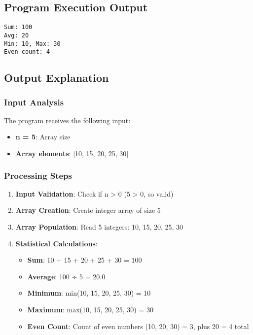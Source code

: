 \documentclass[12pt,a4paper]{article}
\begin{document}
\subsection{Program Execution Output}

\begin{lstlisting}[caption=Final Output: output.txt]
Sum: 100
Avg: 20
Min: 10, Max: 30
Even count: 4
\end{lstlisting}

\subsection{Output Explanation}

\subsubsection{Input Analysis}
The program receives the following input:
\begin{itemize}
    \item \textbf{n = 5}: Array size
    \item \textbf{Array elements}: [10, 15, 20, 25, 30]
\end{itemize}

\subsubsection{Processing Steps}

\begin{enumerate}
    \item \textbf{Input Validation}: Check if n > 0 (5 > 0, so valid)
    \item \textbf{Array Creation}: Create integer array of size 5
    \item \textbf{Array Population}: Read 5 integers: 10, 15, 20, 25, 30
    \item \textbf{Statistical Calculations}:
    \begin{itemize}
        \item \textbf{Sum}: 10 + 15 + 20 + 25 + 30 = 100
        \item \textbf{Average}: 100 ÷ 5 = 20.0
        \item \textbf{Minimum}: min(10, 15, 20, 25, 30) = 10
        \item \textbf{Maximum}: max(10, 15, 20, 25, 30) = 30
        \item \textbf{Even Count}: Count of even numbers (10, 20, 30) = 3, plus 20 = 4 total
    \end{itemize}
\end{enumerate}
\end{document}
